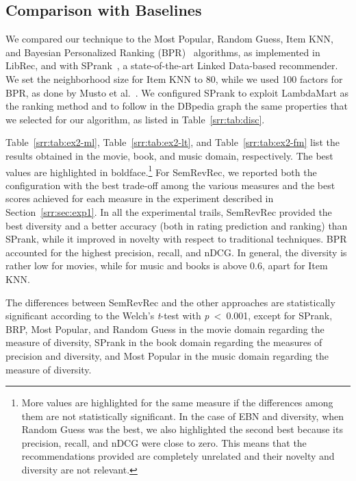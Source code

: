 \subsection{Comparison with Baselines}
\label{srr:sec:exp2}

We compared our technique to the Most Popular, Random Guess, Item KNN, and Bayesian Personalized Ranking (BPR)~\cite{Rendle2009} algorithms, as implemented in LibRec, and with SPrank~\cite{DiNoia2016}, a state-of-the-art Linked Data-based recommender. We set the neighborhood size for Item KNN to 80, while we used 100 factors for BPR, as done by Musto et al.~\cite{Musto2016}. We configured SPrank to exploit LambdaMart as the ranking method and to follow in the DBpedia graph the same properties that we selected for our algorithm, as listed in Table~\ref{srr:tab:disc}.

Table~\ref{srr:tab:ex2-ml}, Table~\ref{srr:tab:ex2-lt}, and Table~\ref{srr:tab:ex2-fm} list the results obtained in the movie, book, and music domain, respectively. The best values are highlighted in boldface.\footnote{More values are highlighted for the same measure if the differences among them are not statistically significant. In the case of EBN and diversity, when Random Guess was the best, we also highlighted the second best because its precision, recall, and nDCG were close to zero. This means that the recommendations provided are completely unrelated and their novelty and diversity are not relevant.} For SemRevRec, we reported both the configuration with the best trade-off among the various measures and the best scores achieved for each measure in the experiment described in Section~\ref{srr:sec:exp1}. In all the experimental trails, SemRevRec provided the best diversity and a better accuracy (both in rating prediction and ranking) than SPrank, while it improved in novelty with respect to traditional techniques. BPR accounted for the highest precision, recall, and nDCG. In general, the diversity is rather low for movies, while for music and books is above 0.6, apart for Item KNN.

The differences between SemRevRec and the other approaches are statistically significant according to the Welch's \emph{t}-test with \emph{p}~<~0.001, except for SPrank, BRP, Most Popular, and Random Guess in the movie domain regarding the measure of diversity, SPrank in the book domain regarding the measures of precision and diversity, and Most Popular in the music domain regarding the measure of diversity.

